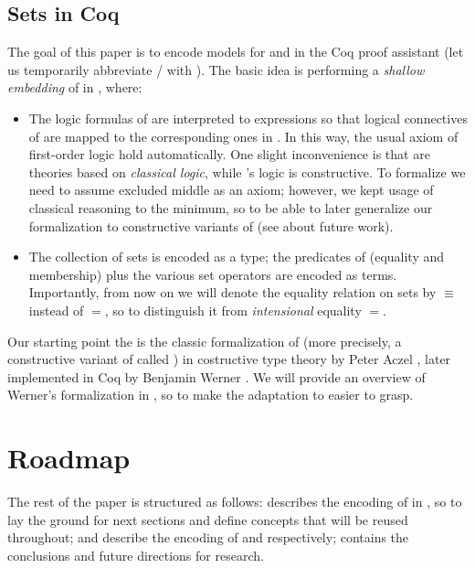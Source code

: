 \documentclass[sigplan,10pt,anonymous,review]{acmart}%
\begin{document}
\subsection{Sets in Coq}
The goal of this paper is to encode models for \NFTWO{} and \NFO{} in the Coq proof assistant \cite{coq} (let us temporarily abbreviate \NFTWO/\NFO{} with \NFX{}).
% 
The basic idea is performing a \emph{shallow embedding} of \NFX{} in \Coq, where:

\begin{itemize}
  \item 
    The logic formulas of \NFX{} are interpreted to \Coq{} expressions so that logical connectives of \NFX{} are mapped to the corresponding ones in \Coq{}. In this way, the usual axiom of first-order logic hold automatically. One slight inconvenience is that \NFX{} are theories based on \emph{classical logic}, while \Coq's logic is constructive. To formalize \NFX{} we need to assume excluded middle as an axiom; however, we kept usage of classical reasoning to the minimum, so to be able to later generalize our formalization to constructive variants of \NFX{} (see  about future work).
  \item The collection of \NFX{} sets is encoded as a \Coq{} type; the predicates of \NFX{} (equality and membership) plus the various set operators are encoded as \Coq{} terms. Importantly, from now on we will denote the equality relation on \NFX{} sets by $\equiv$ instead of $=$, so to distinguish it from \Coq{} \emph{intensional} equality $=$.
\end{itemize}

Our starting point the is the classic formalization of \ZF{} (more precisely, a constructive variant of \ZF{} called \ZFC{}) in costructive type theory by Peter Aczel \cite{ACZEL197855}, later implemented in Coq by Benjamin Werner \cite{DBLP:conf/tacs/Werner97}. We will provide an overview of Werner's formalization in , so to make the adaptation to \NFX{} easier to grasp.

\section{Roadmap}
The rest of the paper is structured as follows:
 describes the encoding of \ZF{} in \Coq{}, so to lay the ground for next sections and define concepts that will be reused throughout;  and  describe the encoding of \NFTWO{} and \NFO{} respectively;  contains the conclusions and future directions for research.
\end{document}
